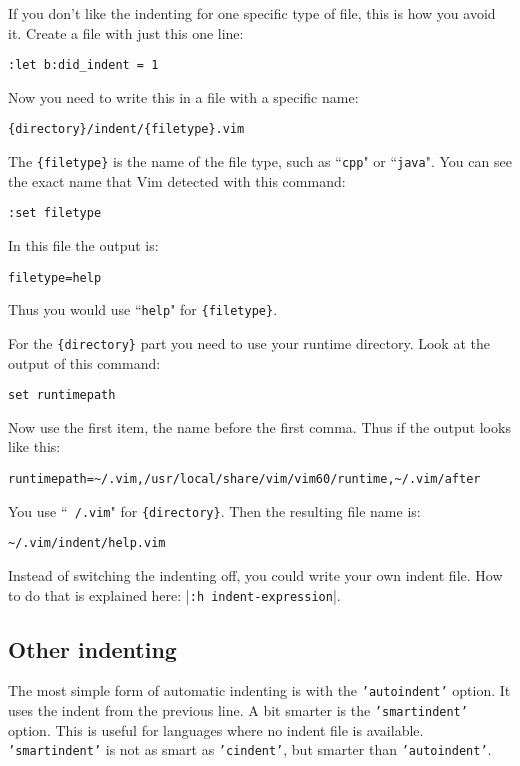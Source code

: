If you don't like the indenting for one specific type of file, this is how you avoid it.
Create a file with just this one line:

\begin{Verbatim}[samepage=true]
 :let b:did_indent = 1
\end{Verbatim}

Now you need to write this in a file with a specific name:

\begin{Verbatim}[samepage=true]
    {directory}/indent/{filetype}.vim
\end{Verbatim}

The \texttt{\{filetype\}} is the name of the file type, such as ``\texttt{cpp}" or ``\texttt{java}".
You can see the exact name that Vim detected with this command:

\begin{Verbatim}[samepage=true]
 :set filetype
\end{Verbatim}

In this file the output is:

\begin{Verbatim}[samepage=true]
    filetype=help 
\end{Verbatim}

Thus you would use ``\texttt{help}" for \texttt{\{filetype\}}.

For the \texttt{\{directory\}} part you need to use your runtime directory.
Look at the output of this command:

\begin{Verbatim}[samepage=true]
 set runtimepath
\end{Verbatim}

Now use the first item, the name before the first comma.
Thus if the output looks like this:

\begin{Verbatim}[samepage=true]
    runtimepath=~/.vim,/usr/local/share/vim/vim60/runtime,~/.vim/after 
\end{Verbatim}

You use ``\texttt{~/.vim}" for \texttt{\{directory\}}.
Then the resulting file name is:

\begin{Verbatim}[samepage=true]
    ~/.vim/indent/help.vim 
\end{Verbatim}

Instead of switching the indenting off, you could write your own indent file.
How to do that is explained here: |\texttt{:h indent-expression}|.
\subsection{Other indenting}
The most simple form of automatic indenting is with the \texttt{'autoindent'} option.
It uses the indent from the previous line.
A bit smarter is the \texttt{'smartindent'} option.
This is useful for languages where no indent file is available.
\texttt{'smartindent'} is not as smart as \texttt{'cindent'}, but smarter than \texttt{'autoindent'}.

